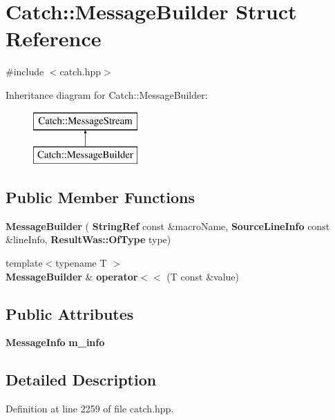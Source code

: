 \section{Catch\+::Message\+Builder Struct Reference}
\label{struct_catch_1_1_message_builder}


{\ttfamily \#include $<$catch.\+hpp$>$}

Inheritance diagram for Catch\+::Message\+Builder\+:\begin{figure}[H]
\begin{center}
\leavevmode
\includegraphics[height=2.000000cm]{struct_catch_1_1_message_builder}
\end{center}
\end{figure}
\subsection*{Public Member Functions}
\begin{DoxyCompactItemize}
\item 
\textbf{ Message\+Builder} (\textbf{ String\+Ref} const \&macro\+Name, \textbf{ Source\+Line\+Info} const \&line\+Info, \textbf{ Result\+Was\+::\+Of\+Type} type)
\item 
{\footnotesize template$<$typename T $>$ }\\\textbf{ Message\+Builder} \& \textbf{ operator$<$$<$} (T const \&value)
\end{DoxyCompactItemize}
\subsection*{Public Attributes}
\begin{DoxyCompactItemize}
\item 
\textbf{ Message\+Info} \textbf{ m\+\_\+info}
\end{DoxyCompactItemize}


\subsection{Detailed Description}


Definition at line 2259 of file catch.\+hpp.



